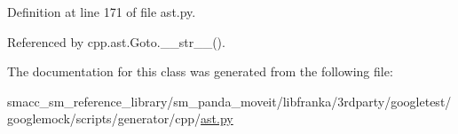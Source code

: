 Definition at line 171 of file ast.\+py.



Referenced by cpp.\+ast.\+Goto.\+\_\+\+\_\+str\+\_\+\+\_\+().



The documentation for this class was generated from the following file\+:\begin{DoxyCompactItemize}
\item 
smacc\+\_\+sm\+\_\+reference\+\_\+library/sm\+\_\+panda\+\_\+moveit/libfranka/3rdparty/googletest/googlemock/scripts/generator/cpp/\hyperlink{ast_8py}{ast.\+py}\end{DoxyCompactItemize}
